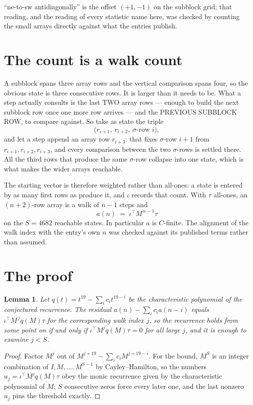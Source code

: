 \documentclass[11pt,a4paper]{article}
\theoremstyle{plain}
\newtheorem{lemma}[theorem]{Lemma}
\theoremstyle{definition}
\begin{document}
``ne-to-sw antidiagonally'' is the offset $(+1,-1)$ on the subblock grid; that reading, and
the reading of every statistic name here, was checked by counting the small arrays directly
against what the entries publish.

\section{The count is a walk count}

A subblock spans three array rows and the vertical comparison spans four, so the obvious state
is three consecutive rows. It is larger than it needs to be. What a step actually consults is
the last TWO array rows --- enough to build the next subblock row once one more row arrives ---
and the PREVIOUS SUBBLOCK ROW, to compare against. So take as state the triple
\[
\bigl(r_{i+1},\ r_{i+2},\ \sigma\text{-row }i\bigr),
\]
and let a step append an array row $r_{i+3}$: that fixes $\sigma$-row $i+1$ from
$r_{i+1},r_{i+2},r_{i+3}$, and every comparison between the two $\sigma$-rows is settled
there. All the third rows that produce the same $\sigma$-row collapse into one state, which is
what makes the wider arrays reachable.

The starting vector is therefore weighted rather than all-ones: a state is entered by as many
first rows as produce it, and $\iota$ records that count. With $\tau$ all-ones, an
$(n+2)$-row array is a walk of $n-1$ steps and
\[
a(n)\;=\;\iota^{\!\top}M^{\,n-1}\tau
\]
on the $S=4682$ reachable states. In particular $a$ is $C$-finite. The alignment of the walk
index with the entry's own $n$ was checked against its published terms rather than assumed.

\section{The proof}

\begin{lemma}\label{lem:crit}
Let $q(t)=t^{19}-\sum_i c_it^{19-i}$ be the characteristic polynomial of the
conjectured recurrence. The residual $a(n)-\sum_ic_ia(n-i)$ equals
$\iota^{\!\top}M^{\,j}q(M)\tau$ for the corresponding walk index $j$, so the recurrence
holds from some point on if and only if $\iota^{\!\top}M^{j}q(M)\tau=0$ for all large $j$,
and it is enough to examine $j<S$.
\end{lemma}

\begin{proof}
Factor $M^{j}$ out of $M^{j+19}-\sum_ic_iM^{j+19-i}$. For the bound, $M^{S}$
is an integer combination of $I,M,\dots,M^{S-1}$ by Cayley--Hamilton, so the numbers
$u_j=\iota^{\!\top}M^{j}q(M)\tau$ obey the monic recurrence given by the characteristic
polynomial of $M$; $S$ consecutive zeros force every later one, and the last nonzero $u_j$
pins the threshold exactly.
\end{proof}
\end{document}
